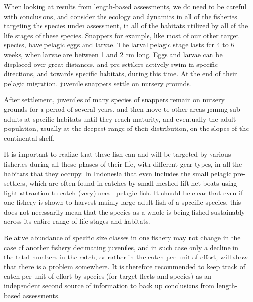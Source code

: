 When looking at results from length-based assessments, we do need to be careful with conclusions, and consider the ecology and dynamics in all of the fisheries targeting the species under assessment, in all of the habitats utilized by all of the life stages of these species. Snappers for example, like most of our other target species, have pelagic eggs and larvae. The larval pelagic stage lasts for 4 to 6 weeks, when larvae are between 1 and 2 cm long. Eggs and larvae can be displaced over great distances, and pre-settlers actively swim in specific directions, and towards specific habitats, during this time. At the end of their pelagic migration, juvenile snappers settle on nursery grounds.

After settlement, juveniles of many species of snappers remain on nursery grounds for a period of several years, and then move to other areas joining sub-adults at specific habitats until they reach maturity, and eventually the adult population, usually at the deepest range of their distribution, on the slopes of the continental shelf.

It is important to realize that these fish can and will be targeted by various fisheries during all these phases of their life, with different gear types, in all the habitats that they occupy. In Indonesia that even includes the small pelagic pre-settlers, which are often found in catches by small meshed lift net boats using light attraction to catch (very) small pelagic fish. It should be clear that even if one fishery is shown to harvest mainly large adult fish of a specific species, this does not necessarily mean that the species as a whole is being fished sustainably across its entire range of life stages and habitats.

Relative abundance of specific size classes in one fishery may not change in the case of another fishery decimating juveniles, and in such case only a decline in the total numbers in the catch, or rather in the catch per unit of effort, will show that there is a problem somewhere. It is therefore recommended to keep track of catch per unit of effort by species (for target fleets and species) as an independent second source of information to back up conclusions from length-based assessments.
